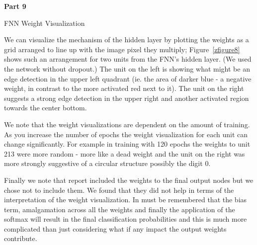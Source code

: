 \documentclass{article}
\begin{document}
\pagebreak
\begin{center}
\textbf{Part 9 }
\end{center}
\begin{biomathg}
\noindent FNN Weight Visualization
\end{biomathg}
\vspace{0.5cm}

We can visualize the mechanism of the hidden layer by plotting the weights as a grid arranged to line up with the image pixel they multiply; Figure~\ref{zfigure8} shows such an arrangement for two units from the FNN's hidden layer. (We used the network without dropout.) The unit on the left is showing what might be an edge detection in the upper left quadrant (ie. the area of darker blue - a negative weight, in contrast to the more activated red next to it). The unit on the right suggests a strong edge detection in the upper right and another activated region towards the center bottom. 

We note that the weight visualizations are dependent on the amount of training. As you increase the number of epochs the weight visualization for each unit can change significantly. For example in training with 120 epochs the weights to unit 213 were more random - more like a dead weight and the unit on the right was more strongly suggestive of a circular structure possibly the digit $0$. 

Finally we note that report included the weights to the final output nodes but we chose not to include them. We found that they did not help in terms of the interpretation of the weight visualization. In must be remembered that the bias term, amalgamation across all the weights and finally the application of the softmax will result in the final classification probabilities and this is much more complicated than just considering what if any impact the output weights contribute.

\end{document}
